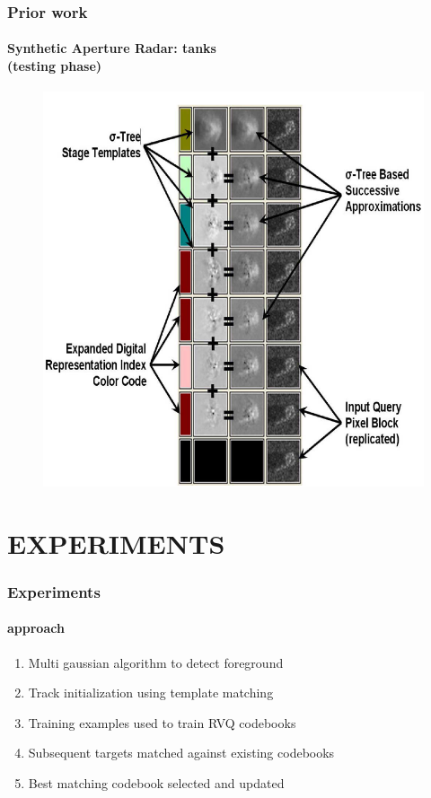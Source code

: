 \begin{frame}
\frametitle{Prior work}
\framesubtitle{\small Synthetic Aperture Radar: tanks\\(testing phase)}
\logoCSIPCPL\mypagenum
	\begin{figure}		
		\includegraphics[height=0.8\textheight]{figs/RVQ_SARtank_3_reconstruction.png}			
	\end{figure}
\end{frame}


\section{EXPERIMENTS}
\begin{frame}
\frametitle{Experiments}
\framesubtitle{approach}
\logoCSIPCPL\mypagenum
	\begin{enumerate}		
		\item Multi gaussian algorithm to detect foreground
		\item Track initialization using template matching
		\item Training examples used to train RVQ codebooks
		\item Subsequent targets matched against existing codebooks
		\item Best matching codebook selected and updated
	\end{enumerate}
\end{frame}


